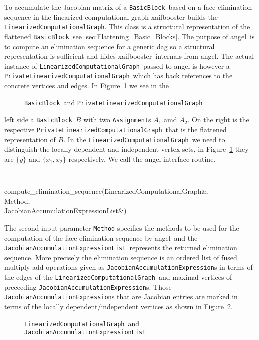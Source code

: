 \documentclass{book}
\newcommand{\angel}{angel}
\newcommand{\xaifbooster}{xaifbooster}
\newcommand{\Assignment}{{\tt Assignment}}
\newcommand{\BasicBlock}{{\tt BasicBlock}}
\newcommand{\JacobianAccumulationExpression}{{\tt JacobianAccumulationExpression}}
\newcommand{\JacobianAccumulationExpressionList}{{\tt JacobianAccumulationExpressionList}}
\newcommand{\LinearizedComputationalGraph}{{\tt LinearizedComputationalGraph}}
\newcommand{\PrivateLinearizedComputationalGraph}{{\tt PrivateLinearizedComputationalGraph}}
\begin{document}
To accumulate the Jacobian matrix of a \BasicBlock\ based on a face 
elimination sequence in the linearized computational graph xaifbooster
builds the \LinearizedComputationalGraph.  This class is a structural 
representation of the flattened \BasicBlock\ see \ref{sec:Flattening_Basic_Blocks}.
The purpose of \angel\ is to compute an elimination sequence for a generic dag 
so a structural representation is sufficient and hides \xaifbooster\ internals from 
\angel. The actual instance of \LinearizedComputationalGraph\ passed to \angel 
is however a \PrivateLinearizedComputationalGraph\ which has back references to the 
concrete vertices and edges. In Figure~\ref{fig:angel_input} we see in the 
\begin{figure}
\caption{\BasicBlock\ and \PrivateLinearizedComputationalGraph}
\label{fig:angel_input}
\end{figure}
left side a \BasicBlock\ $B$ with two {\Assignment}s $A_1$ amd $A_2$. On the right is 
the respective \PrivateLinearizedComputationalGraph\ that is the flattened representation 
of $B$. In the \LinearizedComputationalGraph\ we need to distinguish the locally dependent and 
independent vertex sets, in Figure~\ref{fig:angel_input} they are $\{y\}$ and $\{x_1,x_2\}$ respectively.
We call the angel interface
routine.
{
\tt
\begin{tabbing}
compute\_elimination\_sequence(\=LinearizedComputationalGraph\&,\\
\>Method,\\
\>JacobianAccumulationExpressionList\&)\\ 
\end{tabbing}
}
The second input parameter {\tt Method} specifies the methods to be used for
the computation of the face elimination sequence by \angel\ and the \JacobianAccumulationExpressionList\
represents the returned elimination sequence. 
More precisely the elimination sequence is an ordered list of fused multiply add operations 
given as  {\JacobianAccumulationExpression}s in terms of the edges of the \LinearizedComputationalGraph\ and 
maximal vertices of preceeding {\JacobianAccumulationExpression}s. 
Those {\JacobianAccumulationExpression}s that are Jacobian entries are marked in terms of the locally dependent/independent vertices as shown in Figure~\ref{fig:angel_output}.
\begin{figure}
\caption{\LinearizedComputationalGraph\ and \JacobianAccumulationExpressionList}
\label{fig:angel_output}
\end{figure}
\end{document}
